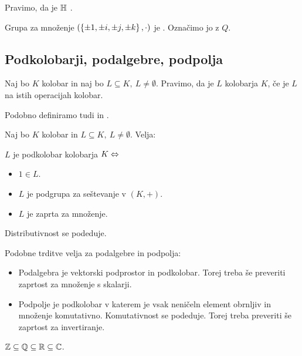 Pravimo, da je $\mathbb{H}$ . 

Grupa za množenje $(\left\{\pm 1, \pm i, \pm j, \pm k\right\}, \cdot)$ je . Označimo jo z $Q$.

\subsection{Podkolobarji, podalgebre, podpolja}
\begin{definicija}
    Naj bo $K$ kolobar in naj bo $L \subseteq K, \ L \neq \emptyset$. Pravimo, da je $L$  kolobarja $K$, če je $L$ na istih operacijah kolobar.
\end{definicija}

\begin{opomba}
    Podobno definiramo tudi  in .
\end{opomba}

\begin{trditev}
    Naj bo $K$ kolobar in $L \subseteq K, \ L \neq \emptyset$. Velja: 

    $L$ je podkolobar kolobarja $K \Leftrightarrow$
    \begin{itemize}
        \item $1 \in L$.
        \item $L$ je podgrupa za seštevanje v $(K,+)$.
        \item $L$ je zaprta za množenje.
    \end{itemize}
\end{trditev}

\begin{opomba}
    Distributivnost se podeduje.
\end{opomba}

\begin{opomba}
    Podobne trditve velja za podalgebre in podpolja:
    \begin{itemize}
        \item Podalgebra je vektorski podprostor in podkolobar. Torej treba še preveriti zaprtost za množenje s skalarji.
        \item Podpolje je podkolobar v katerem je vsak neničeln element obrnljiv in množenje komutativno. Komutativnost se podeduje. Torej treba preveriti še zaprtost za invertiranje.
    \end{itemize}
\end{opomba}

\begin{primer}
    $\mathbb{Z} \subseteq \mathbb{Q} \subseteq \mathbb{R} \subseteq \mathbb{C}$.
\end{primer}

